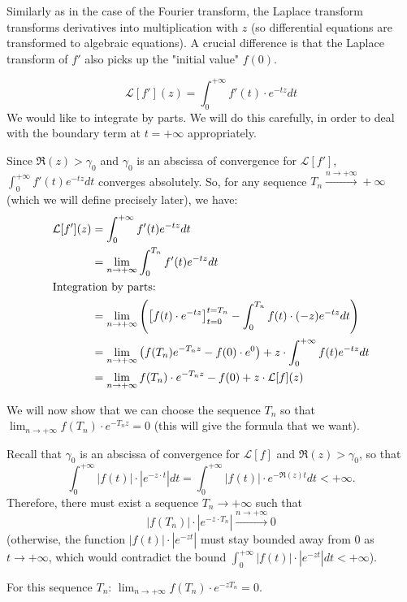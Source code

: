 \begin{remark}[Remark]
    Similarly as in the case of the Fourier transform, the Laplace transform transforms derivatives into multiplication with $z$ (so differential equations are transformed to algebraic equations). A crucial difference is that the Laplace transform of $f'$ also picks up the "initial value" $f(0)$.
\end{remark}

\begin{proofbox}
    \[
        \mathcal{L}[f'](z) = \int_{0}^{+\infty} f'(t) \cdot e^{-tz} dt
    \]
    We would like to integrate by parts. We will do this carefully, in order to deal with the boundary term at $t = +\infty$ appropriately.
    
    Since $\Re(z) > \gamma_0$ and $\gamma_0$ is an abscissa of convergence for $\mathcal{L}[f']$, $\int_{0}^{+\infty} f'(t)e^{-tz}dt$ converges absolutely. So, for any sequence $T_n \xrightarrow{n \to +\infty} +\infty$ (which we will define precisely later), we have:
    \begin{align*}
        \mathcal{L}[f'](z) &= \int_{0}^{+\infty} f'(t)e^{-tz}dt \\
        &= \lim_{n \to +\infty} \int_{0}^{T_n} f'(t)e^{-tz}dt \\
        \intertext{Integration by parts:}
        &= \lim_{n \to +\infty} \left( \left[ f(t) \cdot e^{-tz} \right]_{t=0}^{t=T_n} - \int_{0}^{T_n} f(t) \cdot (-z)e^{-tz}dt \right) \\
        &= \lim_{n \to +\infty} \left( f(T_n)e^{-T_n z} - f(0) \cdot e^0 \right) + z \cdot \int_{0}^{+\infty} f(t)e^{-tz}dt \\
        &= \lim_{n \to +\infty} f(T_n) \cdot e^{-T_n z} - f(0) + z \cdot \mathcal{L}[f](z)
    \end{align*}
    
    We will now show that we can choose the sequence $T_n$ so that $\lim_{n \to +\infty} f(T_n) \cdot e^{-T_n z} = 0$ (this will give the formula that we want). 
    
    Recall that $\gamma_0$ is an abscissa of convergence for $\mathcal{L}[f]$ and $\Re(z) > \gamma_0$, so that
    \[
        \int_{0}^{+\infty} |f(t)| \cdot |e^{-z \cdot t}| dt = \int_{0}^{+\infty} |f(t)| \cdot e^{-\Re(z)t} dt < +\infty.
    \]
    Therefore, there must exist a sequence $T_n \to +\infty$ such that 
    \[
        |f(T_n)| \cdot |e^{-z \cdot T_n}| \xrightarrow{n \to +\infty} 0
    \]
    (otherwise, the function $|f(t)| \cdot |e^{-zt}|$ must stay bounded away from $0$ as $t \to +\infty$, which would contradict the bound $\int_{0}^{+\infty} |f(t)| \cdot |e^{-zt}| dt < +\infty$).
    
    For this sequence $T_n$: $\lim_{n \to +\infty} f(T_n) \cdot e^{-z T_n} = 0$.
\end{proofbox}

